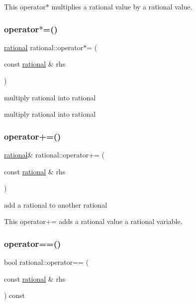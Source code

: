 This operator$\ast$ multiplies a rational value by a rational value. \mbox{\label{classrational_a2b5729aef261d16cd18ff7c7fcbf8c6e}} 
\subsubsection{\texorpdfstring{operator$\ast$=()}{operator*=()}}
{\footnotesize\ttfamily \hyperlink{classrational}{rational} rational\+::operator$\ast$= (\begin{DoxyParamCaption}\item[{const \hyperlink{classrational}{rational} \&}]{rhs }\end{DoxyParamCaption})\hspace{0.3cm}{\ttfamily [inline]}}



multiply rational into rational 

multiply rational into rational \mbox{\label{classrational_a9b83ad0c803d2ac242b42e71d954a356}} 
\subsubsection{\texorpdfstring{operator+=()}{operator+=()}}
{\footnotesize\ttfamily \hyperlink{classrational}{rational}\& rational\+::operator+= (\begin{DoxyParamCaption}\item[{const \hyperlink{classrational}{rational} \&}]{rhs }\end{DoxyParamCaption})\hspace{0.3cm}{\ttfamily [inline]}}



add a rational to another rational 

This operator+= adds a rational value a rational variable. \mbox{\label{classrational_a8b565720ea15ddfb17ea202e27698478}} 
\subsubsection{\texorpdfstring{operator==()}{operator==()}}
{\footnotesize\ttfamily bool rational\+::operator== (\begin{DoxyParamCaption}\item[{const \hyperlink{classrational}{rational} \&}]{rhs }\end{DoxyParamCaption}) const\hspace{0.3cm}{\ttfamily [inline]}}



